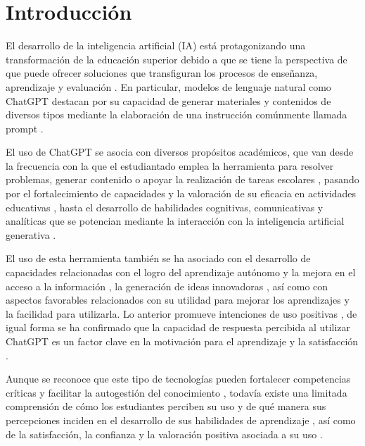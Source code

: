 \documentclass[spanish]{textolivre}
\begin{document}
\begin{polyabstract}
\begin{english}
\begin{abstract}
\end{abstract}
\end{english}
\end{polyabstract}

\section{Introducción}\label{sec-intro}
El desarrollo de la inteligencia artificial (IA) está protagonizando una transformación de la educación superior \cite{ansari2024, enang2025} debido a que se tiene la perspectiva de que puede ofrecer soluciones que transfiguran los procesos de enseñanza, aprendizaje y evaluación \cite{ali2024, fernandezmiranda2024}. En particular, modelos de lenguaje natural como ChatGPT destacan por su capacidad de generar materiales y contenidos de diversos tipos mediante la elaboración de una instrucción comúnmente llamada prompt \cite{elbanna2024, garcialopez2025}. 

El uso de ChatGPT se asocia con diversos propósitos académicos, que van desde la frecuencia con la que el estudiantado emplea la herramienta para resolver problemas, generar contenido o apoyar la realización de tareas escolares \cite{habibi2023}, pasando por el fortalecimiento de capacidades y la valoración de su eficacia en actividades educativas \cite{rahman2023}, hasta el desarrollo de habilidades cognitivas, comunicativas y analíticas que se potencian mediante la interacción con la inteligencia artificial generativa \cite{fu2025}.

El uso de esta herramienta también se ha asociado con el desarrollo de capacidades relacionadas con el logro del aprendizaje autónomo y la mejora en el acceso a la información \cite{georgereyes2025}, la generación de ideas innovadoras \cite{ibrahimi2024}, así como con aspectos favorables relacionados con su utilidad para mejorar los aprendizajes y la facilidad para utilizarla. Lo anterior promueve intenciones de uso positivas \cite{foroughi2025}, de igual forma se ha confirmado que la capacidad de respuesta percibida al utilizar ChatGPT es un factor clave en la motivación para el aprendizaje y la satisfacción \cite{kimetal2025}.

Aunque se reconoce que este tipo de tecnologías pueden fortalecer competencias críticas y facilitar la autogestión del conocimiento \cite{rivadeneira2025}, todavía existe una limitada comprensión de cómo los estudiantes perciben su uso y de qué manera sus percepciones inciden en el desarrollo de sus habilidades de aprendizaje \cite{malik2025}, así como de la satisfacción, la confianza y la valoración positiva asociada a su uso \cite{pabreja2024}.
\end{document}
